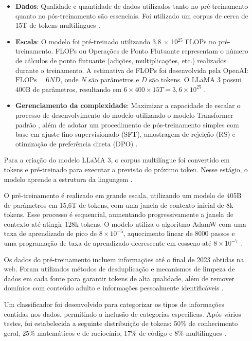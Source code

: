 \begin{itemize}
    \item \textbf{Dados}: Qualidade e quantidade de dados utilizados tanto no pré-treinamento quanto no pós-treinamento são essenciais. Foi utilizado um corpus de cerca de 15T de tokens multilíngues \cite{llama3}.
    \item \textbf{Escala}: O modelo foi pré-treinado utilizando 3,8 \(\times\) 10\(^{25}\) FLOPs no pré-treinamento. FLOPs ou Operações de Ponto Flutuante representam o número de cálculos de ponto flutuante (adições, multiplicações, etc.) realizados durante o treinamento. A estimativa de FLOPs foi desenvolvida pela OpenAI: \(\text{FLOPs} = 6ND\), onde \(N\) são parâmetros e \(D\) são tokens. O LLaMA 3 possui 400B de parâmetros, resultando em \(6 \times 400 \times 15T = 3,6 \times 10^{25}\) \cite{llama3}.
    \item \textbf{Gerenciamento da complexidade}: Maximizar a capacidade de escalar o processo de desenvolvimento do modelo utilizando o modelo Transformer padrão \cite{vaswani2017}, além de adotar um procedimento de pós-treinamento simples com base em ajuste fino supervisionado (SFT), amostragem de rejeição (RS) e otimização de preferência direta (DPO) \cite{rafailov2024}.
\end{itemize}

Para a criação do modelo LLaMA 3, o corpus multilíngue foi convertido em tokens e pré-treinado para executar a previsão do próximo token. Nesse estágio, o modelo aprende a estrutura da linguagem \cite{llama3}.

O pré-treinamento é realizado em grande escala, utilizando um modelo de 405B de parâmetros em 15,6T de tokens, com uma janela de contexto inicial de 8k tokens. Esse processo é sequencial, aumentando progressivamente a janela de contexto até atingir 128k tokens. O modelo utiliza o algoritmo AdamW com uma taxa de aprendizado de pico de \(8 \times 10^{-5}\), aquecimento linear de 8000 passos e uma programação de taxa de aprendizado decrescente em cosseno até \(8 \times 10^{-7}\) \cite{llama3}.

Os dados do pré-treinamento incluem informações até o final de 2023 obtidas na web. Foram utilizados métodos de desduplicação e mecanismos de limpeza de dados em cada fonte para garantir tokens de alta qualidade, além de remover domínios com conteúdo adulto e informações pessoalmente identificáveis \cite{llama3}.

Um classificador foi desenvolvido para categorizar os tipos de informações contidas nos dados, permitindo a inclusão de categorias específicas. Após vários testes, foi estabelecida a seguinte distribuição de tokens: 50\% de conhecimento geral, 25\% matemáticos e de raciocínio, 17\% de código e 8\% multilíngues \cite{llama3}.

